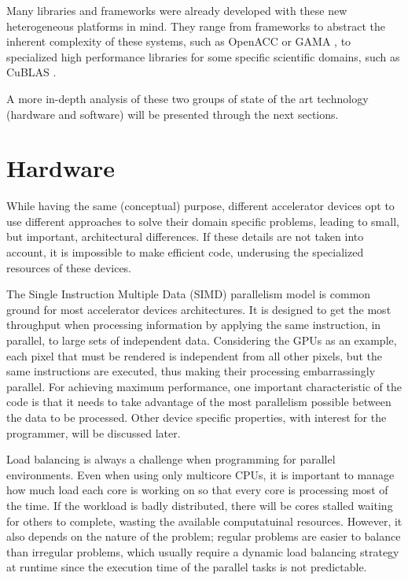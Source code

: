 Many libraries and frameworks were already developed with these new heterogeneous platforms in mind. They range from frameworks to abstract the inherent complexity of these systems, such as OpenACC \cite{OpenACC} or GAMA \cite{GAMA}, to specialized high performance libraries for some specific scientific domains, such as CuBLAS \cite{NVIDIA:CuBLAS}.

A more in-depth analysis of these two groups of state of the art technology (hardware and software) will be presented through the next sections.

\section{Hardware}

While having the same (conceptual) purpose, different accelerator devices opt to use different approaches to solve their domain specific problems, leading to small, but important, architectural differences. If these details are not taken into account, it is impossible to make efficient code, underusing the specialized resources of these devices.

The Single Instruction Multiple Data (SIMD) parallelism model is common ground for most accelerator devices architectures. It is designed to get the most throughput when processing information by applying the same instruction, in parallel, to large sets of independent data. Considering the GPUs as an example, each pixel that must be rendered is independent from all other pixels, but the same instructions are executed, thus making their processing embarrassingly parallel. For achieving maximum performance, one important characteristic of the code is that it needs to take advantage of the most parallelism possible between the data to be processed. Other device specific properties, with interest for the programmer, will be discussed later.

Load balancing is always a challenge when programming for parallel environments. Even when using only multicore CPUs, it is important to manage how much load each core is working on so that every core is processing most of the time. If the workload is badly distributed, there will be cores stalled waiting for others to complete, wasting the available computatuinal resources. However, it also depends on the nature of the problem; regular problems are easier to balance than irregular problems, which usually require a dynamic load balancing strategy at runtime since the execution time of the parallel tasks is not predictable.

